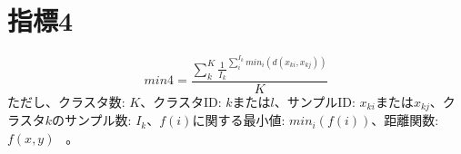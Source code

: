 \documentclass{article}
\begin{document}
\section{指標4}
\begin{equation}
min4={\frac{\sum_{k}^{K}{{\frac{1}{I_k}}^{\sum_{i}^{I_k}{min_i(d(x_{ki},x_{kj}))}}}}{K}}
\end{equation}
ただし、クラスタ数: $K$、クラスタID: $k$または$l$、サンプルID: $x_{ki}$または$x_{kj}$、クラスタ$k$のサンプル数: $I_k$、$f(i)$に関する最小値: $min_i(f(i))$、距離関数:$f(x,y)$  \ 。
\end{document}
